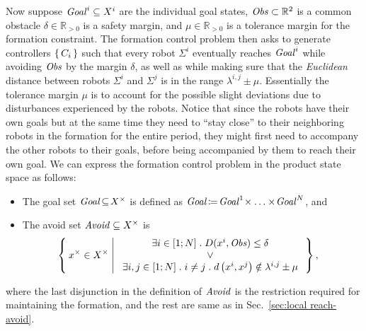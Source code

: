 Now suppose $\mathit{Goal}^i\subseteq X^i$ are the individual goal states, $\mathit{Obs}\subset \mathbb{R}^2$ is a common obstacle %
$\delta \in \mathbb{R}_{>0}$ is a safety margin, and $\mu\in \mathbb{R}_{>0}$ is a tolerance margin for the formation constraint.
The formation control problem then asks to generate controllers $\set{C_i}$ such that every robot $\Sigma^i$ eventually reaches $\mathit{Goal}^i$ while avoiding $\mathit{Obs}$ 
by the margin $\delta$, as well as while making sure that the \emph{Euclidean} distance between robots $\Sigma^i$ and $\Sigma^j$ is in the range $\lambda^{i,j} \pm \mu$.
Essentially the tolerance margin $\mu$ is to account for the possible slight deviations due to disturbances experienced by the robots. 
Notice that since the robots have their own goals but at the same time they need to ``stay close'' to their neighboring robots in the formation for the entire period, 
they might first need to accompany the other robots to their goals, before being accompanied by them to reach their own goal.
%
We can express the formation control problem in the product state space as follows:
\begin{itemize}
	\item The goal set $\mathit{Goal}\!\subseteq\! X^\times$ is defined as $\mathit{Goal}\!\coloneqq\! \mathit{Goal}^1\!\times \ldots \times\! \mathit{Goal}^N$, and
	\item The avoid set $\mathit{Avoid}\subseteq X^\times$ is 
		\begin{align}
			&\Set{ x^\times\in X^\times | 
				\begin{array}{c}
					\exists i\in [1;N]\;.\; D(x^i,\mathit{Obs}) \leq \delta\\
					\vee\\
					\exists i,j\in [1;N]\;.\; i\neq j\;.\; d\left(x^i,x^j\right)\notin\lambda^{i,j}\pm \mu
			\end{array}},					
		\end{align}
\end{itemize}
where the last disjunction in the definition of $\mathit{Avoid}$ is the restriction required for maintaining the formation, and the rest are 
same as in Sec.~\ref{sec:local reach-avoid}.

